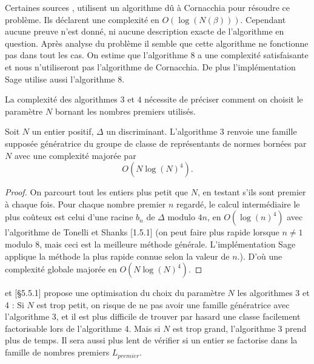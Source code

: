 \begin{Rem}
	Certaines sources \cite{BrokerCharlesLauter}, \cite{JaoSoukharev} utilisent un algorithme dû à Cornacchia pour résoudre ce problème. Ils déclarent une complexité en $O(\log(N(\beta)))$. Cependant aucune preuve n'est donné, ni aucune description exacte de l'algorithme en question. Après analyse du problème il semble que cette algorithme ne fonctionne pas dans tout les cas. On estime que l'algorithme $8$ a une complexité satisfaisante et nous n'utiliseront pas l'algorithme de Cornacchia. De plus l'implémentation Sage utilise aussi l'algorithme $8$. 
\end{Rem}

La complexité des algorithmes $3$ et $4$ nécessite de préciser comment on choisit le paramètre $N$ bornant les nombres premiers utilisés.  

\begin{Prop}
	Soit $N$ un entier positif, $\Delta$ un discriminant. L'algorithme $3$ renvoie une famille supposée génératrice du groupe de classe de représentants de normes bornées par $N$ avec une complexité majorée par 
	\begin{equation*}
		O(N\log(N)^4).
	\end{equation*} 
\end{Prop}

\begin{proof}
	On parcourt tout les entiers plus petit que $N$, en testant s'ils sont premier à chaque fois. Pour chaque nombre premier $n$ regardé, le calcul intermédiaire le plus coûteux est celui d'une racine $b_{n}$ de $\Delta$ modulo $4n$, en $O(\log(n)^4)$ avec l'algorithme de Tonelli et Shanks \cite{Coh00}[1.5.1] (on peut faire plus rapide lorsque $n\neq 1$ modulo $8$, mais ceci est la meilleure méthode générale. L'implémentation Sage applique la méthode la plus rapide connue selon la valeur de $n$.). D'où une complexité globale majorée en $O(N\log(N)^4)$.
\end{proof}

\cite{JaoSoukharev} et \cite{Coh00}[\S 5.5.1] propose une optimisation du choix du paramètre $N$ les algorithmes 3 et 4 : Si $N$ est trop petit, on risque de ne pas avoir une famille génératrice avec l'algorithme 3, et il est plus difficile de trouver par hasard une classe facilement factorisable lors de l'algorithme 4. Mais si $N$ est trop grand, l'algorithme $3$ prend plus de temps. Il sera aussi plus lent de vérifier si un entier se factorise dans la famille de nombres premiers $L_{premier}$.

